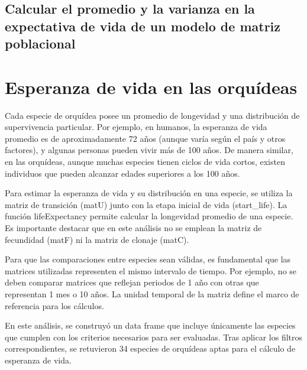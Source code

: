 \documentclass[
  12pt,
  letterpaper,
]{book}
\begin{document}
\subsection{Calcular el promedio y la varianza en la expectativa de vida
de un modelo de matriz
poblacional}\label{calcular-el-promedio-y-la-varianza-en-la-expectativa-de-vida-de-un-modelo-de-matriz-poblacional}

\section{Esperanza de vida en las
orquídeas}\label{esperanza-de-vida-en-las-orquuxeddeas-1}

Cada especie de orquídea posee un promedio de longevidad y una
distribución de supervivencia particular. Por ejemplo, en humanos, la
esperanza de vida promedio es de aproximadamente 72 años (aunque varía
según el país y otros factores), y algunas personas pueden vivir más de
100 años. De manera similar, en las orquídeas, aunque muchas especies
tienen ciclos de vida cortos, existen individuos que pueden alcanzar
edades superiores a los 100 años.

Para estimar la esperanza de vida y su distribución en una especie, se
utiliza la matriz de transición (matU) junto con la etapa inicial de
vida (start\_life). La función lifeExpectancy permite calcular la
longevidad promedio de una especie. Es importante destacar que en este
análisis no se emplean la matriz de fecundidad (matF) ni la matriz de
clonaje (matC).

Para que las comparaciones entre especies sean válidas, es fundamental
que las matrices utilizadas representen el mismo intervalo de tiempo.
Por ejemplo, no se deben comparar matrices que reflejan periodos de 1
año con otras que representan 1 mes o 10 años. La unidad temporal de la
matriz define el marco de referencia para los cálculos.

En este análisis, se construyó un data frame que incluye únicamente las
especies que cumplen con los criterios necesarios para ser evaluadas.
Tras aplicar los filtros correspondientes, se retuvieron 34 especies de
orquídeas aptas para el cálculo de esperanza de vida.
\end{document}
